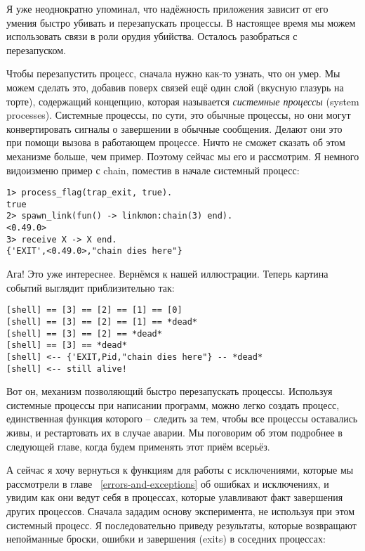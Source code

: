 Я уже неоднократно упоминал, что надёжность приложения зависит от его умения быстро убивать и перезапускать процессы.
В настоящее время мы можем использовать связи в роли орудия убийства.
Осталось разобраться с перезапуском.

Чтобы перезапустить процесс, сначала нужно как\--то узнать, что он умер.
Мы можем сделать это, добавив поверх связей ещё один слой (вкусную глазурь на торте), содержащий концепцию, которая называется \emph{системные процессы} (system processes).
Системные процессы, по сути, это обычные процессы, но они могут конвертировать сигналы о завершении в обычные сообщения.
Делают они это при помощи вызова  в работающем процессе.
Ничто не сможет сказать об этом механизме больше, чем пример.
Поэтому сейчас мы его и рассмотрим.
Я немного видоизменю пример с chain, поместив в начале системный процесс:
\begin{lstlisting}[style=erlang]
1> process_flag(trap_exit, true).
true
2> spawn_link(fun() -> linkmon:chain(3) end).
<0.49.0>
3> receive X -> X end.
{'EXIT',<0.49.0>,"chain dies here"}
\end{lstlisting}

Ага!
Это уже интереснее.
Вернёмся к нашей иллюстрации.
Теперь картина событий выглядит приблизительно так:
\begin{lstlisting}[style=erlang]
[shell] == [3] == [2] == [1] == [0]
[shell] == [3] == [2] == [1] == *dead*
[shell] == [3] == [2] == *dead*
[shell] == [3] == *dead*
[shell] <-- {'EXIT,Pid,"chain dies here"} -- *dead*
[shell] <-- still alive!
\end{lstlisting}

Вот он, механизм позволяющий быстро перезапускать процессы.
Используя системные процессы при написании программ, можно легко создать процесс, единственная функция которого \--- следить за тем, чтобы все процессы оставались живы, и рестартовать их в случае аварии.
Мы поговорим об этом подробнее в следующей главе, когда будем применять этот приём всерьёз.

А сейчас я хочу вернуться к функциям для работы с исключениями, которые мы рассмотрели в главе ~\ref{errors-and-exceptions} об ошибках и исключениях, и увидим как они ведут себя в процессах, которые улавливают факт завершения других процессов.
Сначала  зададим основу эксперимента, не используя при этом системный процесс.
Я последовательно приведу результаты, которые возвращают непойманные броски, ошибки и завершения (exits) в соседних процессах:

